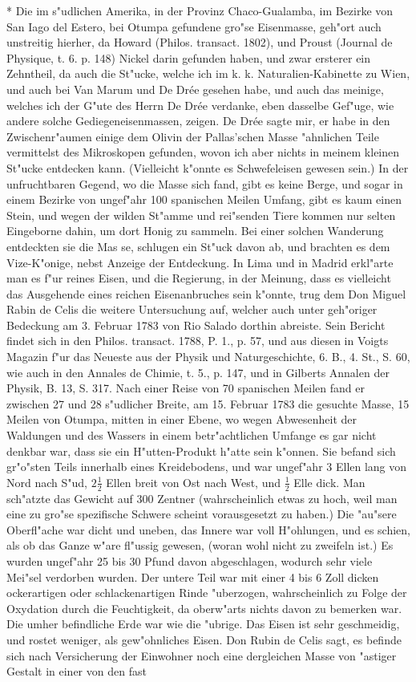 \documentclass[a4paper, 11pt, oneside, polutonikogreek, german]{article}
\begin{document}
* Die im s"udlichen Amerika, in der Provinz Chaco-Gualamba, im Bezirke von San Iago del Estero, bei Otumpa gefundene gro"se Eisenmasse, geh"ort auch unstreitig hierher, da Howard (Philos. transact. 1802), und Proust (Journal de Physique, t. 6. p. 148) Nickel darin gefunden haben, und zwar ersterer ein Zehntheil, da auch die St"ucke, welche ich im k. k. Naturalien-Kabinette zu Wien, und auch bei Van Marum und De Drée gesehen habe, und auch das meinige, welches ich der G"ute des Herrn De Drée verdanke, eben dasselbe Gef"uge, wie andere solche Gediegeneisenmassen, zeigen. De Drée sagte mir, er habe in den Zwischenr"aumen einige dem Olivin der Pallas'schen Masse "ahnlichen Teile vermittelst des Mikroskopen gefunden, wovon ich aber nichts in meinem kleinen St"ucke entdecken kann. (Vielleicht k"onnte es Schwefeleisen gewesen sein.) In der unfruchtbaren Gegend, wo die Masse sich fand, gibt es keine Berge, und sogar in einem Bezirke von ungef"ahr 100 spanischen Meilen Umfang, gibt es kaum einen Stein, und wegen der wilden St"amme und rei"senden Tiere kommen nur selten Eingeborne dahin, um dort Honig zu sammeln. Bei einer solchen Wanderung entdeckten sie die Mas se, schlugen ein St"uck davon ab, und brachten es dem Vize-K"onige, nebst Anzeige der Entdeckung. In Lima und in Madrid erkl"arte man es f"ur reines Eisen, und die Regierung, in der Meinung, dass es vielleicht das Ausgehende eines reichen Eisenanbruches sein k"onnte, trug dem Don Miguel Rabin de Celis die weitere Untersuchung auf, welcher auch unter geh"origer Bedeckung am 3. Februar 1783 von Rio Salado dorthin abreiste. Sein Bericht findet sich in den Philos. transact. 1788, P. 1., p. 57, und aus diesen in Voigts Magazin f"ur das Neueste aus der Physik und Naturgeschichte, 6. B., 4. St., S. 60, wie auch in den Annales de Chimie, t. 5., p. 147, und in Gilberts Annalen der Physik, B. 13, S. 317. Nach einer Reise von 70 spanischen Meilen fand er zwischen 27 und 28 s"udlicher Breite, am 15. Februar 1783 die gesuchte Masse, 15 Meilen von Otumpa, mitten in einer Ebene, wo wegen Abwesenheit der Waldungen und des Wassers in einem betr"achtlichen Umfange es gar nicht denkbar war, dass sie ein H"utten-Produkt h"atte sein k"onnen. Sie befand sich gr"o"sten Teils innerhalb eines Kreidebodens, und war ungef"ahr 3 Ellen lang von Nord nach S"ud, $\mathfrak{2\frac{1}{2}}$ Ellen breit von Ost nach West, und $\mathfrak{\frac{1}{2}}$ Elle dick. Man sch"atzte das Gewicht auf 300 Zentner (wahrscheinlich etwas zu hoch, weil man eine zu gro"se spezifische Schwere scheint vorausgesetzt zu haben.) Die "au"sere Oberfl"ache war dicht und uneben, das Innere war voll H"ohlungen, und es schien, als ob das Ganze w"are fl"ussig gewesen, (woran wohl nicht zu zweifeln ist.) Es wurden ungef"ahr 25 bis 30 Pfund davon abgeschlagen, wodurch sehr viele Mei"sel verdorben wurden. Der untere Teil war mit einer 4 bis 6 Zoll dicken ockerartigen oder schlackenartigen Rinde "uberzogen, wahrscheinlich zu Folge der Oxydation durch die Feuchtigkeit, da oberw"arts nichts davon zu bemerken war. Die umher befindliche Erde war wie die "ubrige. Das Eisen ist sehr geschmeidig, und rostet weniger, als gew"ohnliches Eisen. Don Rubin de Celis sagt, es befinde sich nach Versicherung der Einwohner noch eine dergleichen Masse von "astiger Gestalt in einer von den fast 
\end{document}
